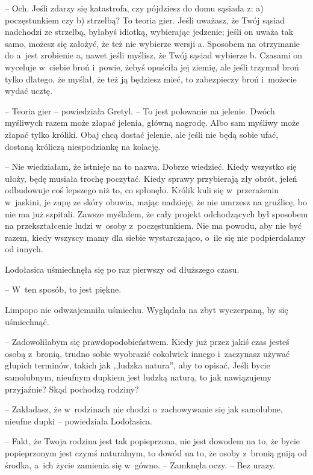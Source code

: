 \documentclass[oneside,polish,11pt,sfheadings]{mwbk}
\begin{document}
-- Och. Jeśli zdarzy się katastrofa, czy pójdziesz do domu sąsiada z: a)
poczęstunkiem czy b) strzelbą? To teoria gier. Jeśli uważasz, że Twój
sąsiad nadchodzi ze strzelbą, byłabyś idiotką, wybierając jedzenie;
jeśli on uważa tak samo, możesz się założyć, że też nie wybierze wersji
a. Sposobem na otrzymanie do a~jest zrobienie a, nawet jeśli myślisz, że
Twój sąsiad wybierze b. Czasami on wyceluje w~ciebie broń i~powie, żebyś
opuściła jej ziemię, ale jeśli trzymał broń tylko dlatego, że myślał, że
też ją będziesz mieć, to zabezpieczy broń i~możecie wydać ucztę.

-- Teoria gier -- powiedziała Gretyl. -- To jest polowanie na jelenie.
Dwóch myśliwych razem może złapać jelenia, główną nagrodę. Albo sam
myśliwy może złapać tylko króliki. Obaj chcą dostać jelenie, ale jeśli
nie będą sobie ufać, dostaną króliczą niespodziankę na kolację.

-- Nie wiedziałam, że istnieje na to nazwa. Dobrze wiedzieć. Kiedy
wszystko się ułoży, będę musiała trochę poczytać. Kiedy sprawy
przybierają zły obrót, jeleń odbudowuje coś lepszego niż to, co
spłonęło. Królik kuli się w~przerażeniu w~jaskini, je zupę ze skóry
obuwia, mając nadzieję, że nie umrzesz na gruźlicę, bo nie ma już
szpitali. Zawsze myślałem, że cały projekt odchodzących był sposobem na
przekształcenie ludzi w~osoby z~poczęstunkiem. Nie ma powodu, aby nie
być razem, kiedy wszyscy mamy dla siebie wystarczająco, o~ile się nie
podpierdalamy od innych.

Lodołasica uśmiechnęła się po raz pierwszy od dłuższego czasu. 

-- W~ten
sposób, to jest piękne.

Limpopo nie odwzajemniła uśmiechu. Wyglądała na zbyt wyczerpaną, by się
uśmiechnąć. 

-- Zadowoliłabym się prawdopodobieństwem. Kiedy już przez
jakiś czas jesteś osobą z~bronią, trudno sobie wyobrazić cokolwiek
innego i~zaczynasz używać głupich terminów, takich jak ,,ludzka
natura'', aby to opisać. Jeśli bycie samolubnym, nieufnym dupkiem jest
ludzką naturą, to jak nawiązujemy przyjaźnie? Skąd pochodzą rodziny?

-- Zakładasz, że w~rodzinach nie chodzi o~zachowywanie się jak samolubne,
nieufne dupki -- powiedziała Lodołasica.

-- Fakt, że Twoja rodzina jest tak popieprzona, nie jest dowodem na to,
że bycie popieprzonym jest czymś naturalnym, to dowód na to, że osoby z~bronią gniją od środka, a~ich życie zamienia się w~gówno. -- Zamknęła
oczy. -- Bez urazy.
\end{document}
